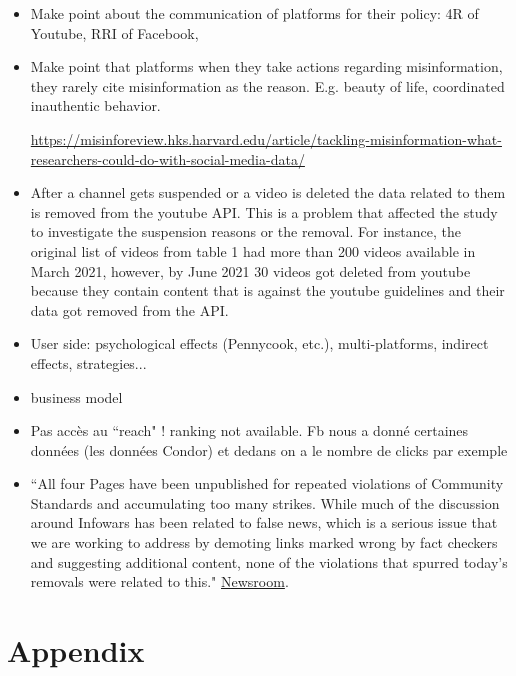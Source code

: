 \documentclass{article}
\begin{document}
{\begin{itemize}
	\item Make point about the communication of platforms for their policy: 4R of Youtube, RRI of Facebook, 

	\item Make point that platforms when they take actions regarding misinformation, they rarely cite misinformation as the reason. E.g. beauty of life, coordinated inauthentic behavior. 

\href{https://misinforeview.hks.harvard.edu/article/tackling-misinformation-what-researchers-could-do-with-social-media-data/}{https://misinforeview.hks.harvard.edu/article/tackling-misinformation-what-researchers-could-do-with-social-media-data/}

	\item After a channel gets suspended or a video is deleted the data related to them is removed from the youtube API. This is a problem that affected the study to investigate the suspension reasons or the removal. For instance, the original list of videos from table 1 had more than 200 videos available in March 2021, however, by June 2021 30 videos got deleted from youtube because they contain content that is against the youtube guidelines and their data got removed from the API. 
	
	\item User side: psychological effects (Pennycook, etc.), multi-platforms, indirect effects, strategies... 
	
	\item business model 
	
	\item Pas accès au ``reach" !  ranking not available. Fb nous a donné certaines données (les données Condor) et dedans on a le nombre de clicks par exemple
	
	\item ``All four Pages have been unpublished for repeated violations of Community Standards and accumulating too many strikes. While much of the discussion around Infowars has been related to false news, which is a serious issue that we are working to address by demoting links marked wrong by fact checkers and suggesting additional content, none of the violations that spurred today’s removals were related to this." \href{https://about.fb.com/news/2018/08/enforcing-our-community-standards/}{Newsroom}.
\end{itemize}
}


 

{}


\section{Appendix}
\end{document}
